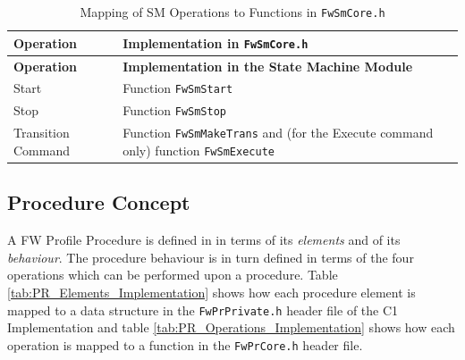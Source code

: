 \documentclass[a4paper,10pt]{article}
\begin{document}
\begin{longtable}{|>{\raggedright}p{2.7cm}|P{8.5cm}|}
\caption{Mapping of SM Operations to Functions in \texttt{FwSmCore.h}}
\label{tab:SM_Operations_Implementation} \\
\hline
{}
\textbf{Operation} & \textbf{Implementation in \texttt{FwSmCore.h}} \\
\hline
\endfirsthead
{}
\textbf{Operation} & \textbf{Implementation in the State Machine Module} \\
\hline
\endhead

Start & Function \texttt{FwSmStart} \\
\hline
Stop  & Function \texttt{FwSmStop} \\
\hline
Transition Command & Function \texttt{FwSmMakeTrans} and (for the Execute command only) 
function \texttt{FwSmExecute} \\
\hline
\end{longtable}

\subsection{Procedure Concept}\label{Appendix_A_Implementation_PR_Concept}
A FW Profile Procedure is defined in \cite{ref:fwprofile} in terms of its \emph{elements} 
and of its \emph{behaviour}. 
The procedure behaviour is in turn defined in terms of the four operations which can 
be performed upon a procedure. 
Table \ref{tab:PR_Elements_Implementation} shows how each procedure element is mapped to 
a data structure in the 
\texttt{FwPrPrivate.h} header file of the C1 Implementation and table \ref{tab:PR_Operations_Implementation} shows 
how each operation is mapped to a function in the \texttt{FwPrCore.h} header file.
\end{document}
